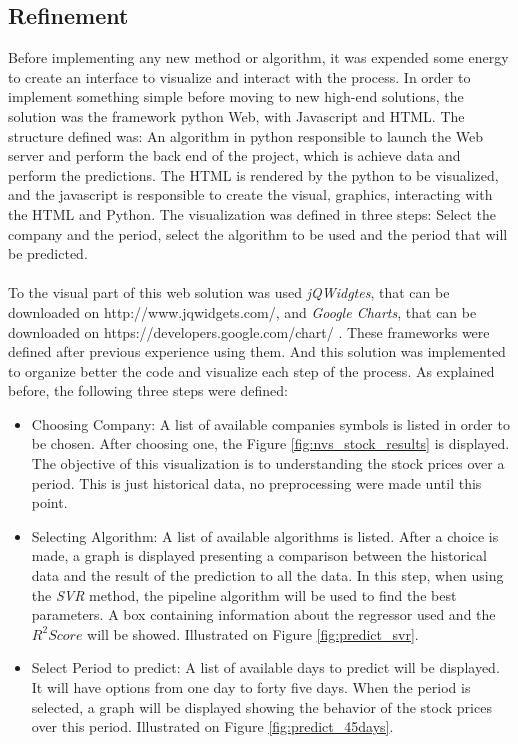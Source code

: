 \subsection{Refinement}
Before implementing any new method or algorithm, it was expended some energy to create an interface to visualize and interact with the process. In order to implement something simple
before moving to new high-end solutions, the solution was the framework python Web, with Javascript and HTML. The structure defined was: An algorithm in python responsible to launch the
Web server and perform the back end of the project, which is achieve data and perform the predictions. The HTML is rendered by the python to be visualized, and the javascript is responsible
to create the visual, graphics, interacting with the HTML and Python. The visualization was defined in three steps: Select the company and the period, select the algorithm to be used and the period
that will be predicted.\\
\\
To the visual part of this web solution was used \textit{jQWidgtes}, that can be downloaded on http://www.jqwidgets.com/, and \textit{Google Charts}, that can be downloaded on https://developers.google.com/chart/ .
These frameworks were defined after previous experience using them. And this solution was implemented to organize better the code and visualize each step of the process. As explained before, the
following three steps were defined:
\begin{itemize}
 \item Choosing Company: A list of available companies symbols is listed in order to be chosen. After choosing one, the Figure \ref{fig:nvs_stock_results} is displayed. The objective of this
 visualization is to understanding the stock prices over a period. This is just historical data, no preprocessing were made until this point. 
 \item Selecting Algorithm: A list of available algorithms is listed. After a choice is made, a graph is displayed presenting a comparison between the historical data and the result of the 
 prediction to all the data. In this step, when using the \textit{SVR} method, the pipeline algorithm will be used to find the best parameters. A box containing information about the regressor
 used and the $R^2 Score$ will be showed. Illustrated on Figure \ref{fig:predict_svr}.
 \item Select Period to predict: A list of available days to predict will be displayed. It will have options from one day to forty five days. When the period is selected, a graph will be displayed
 showing the behavior of the stock prices over this period. Illustrated on Figure \ref{fig:predict_45days}.
\end{itemize}